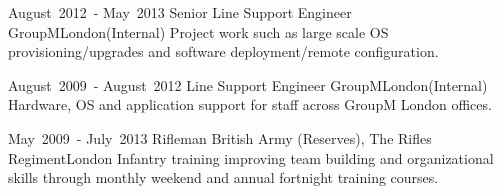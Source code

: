
\cventry %
  {\mbox{August 2012 -} \mbox{May 2013}}
  {Senior  Line Support Engineer}
  {GroupM}{London}{(Internal)}
  {
    Project work such as large scale OS provisioning/upgrades and software 
    deployment/remote configuration.\\
  }

\cventry %
  {\mbox{August 2009 -} \mbox{August 2012}}
  { Line Support Engineer}
  {GroupM}{London}{(Internal)}
  {
    Hardware, OS and application support for staff across GroupM London offices.\\
  }

\cventry %
  {\mbox{May 2009 -} \mbox{July 2013}}
  {Rifleman}
  {British Army (Reserves), The Rifles Regiment}{London}{}
  {
    Infantry training improving team building and organizational skills through 
    monthly weekend and annual fortnight training courses.\\
  }

